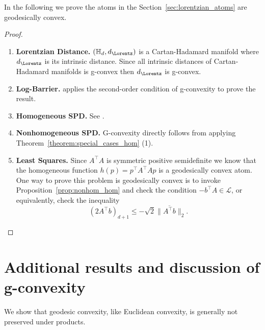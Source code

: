 \documentclass[twoside,11pt]{article}
\begin{document}
\begin{proposition}
    In the following we prove the atoms in the Section~\ref{sec:lorentzian_atoms} are geodesically convex.
\end{proposition}
\begin{proof}
\begin{enumerate}
    \item \textbf{Lorentzian Distance. }$(\mathbb{H}_d, d_\Lorentz)$ is a Cartan-Hadamard manifold where $d_\Lorentz$ is its intrinsic distance. Since all intrinsic distances of Cartan-Hadamard manifolds is g-convex then $d_\Lorentz$ is g-convex.
    \item \textbf{Log-Barrier.}  \citep{Ferreira2022} applies the second-order condition of g-convexity to prove the result.
    \item \textbf{Homogeneous SPD.} See \citep{Ferreira2022}.
    \item \textbf{Nonhomogeneous SPD.} G-convexity directly follows from applying Theorem~\ref{theorem:special_cases_hom} (1).
    \item \textbf{Least Squares.} Since $A^\top A $ is symmetric positive semidefinite we know that the homogeneous function $h(p) = p^\top A^\top A p$ is a geodesically convex atom. One way to prove this problem is geodesically convex is to invoke Proposition~\ref{prop:nonhom_hom} and check the condition $-b^\top A \in \mathscr{L}$, or equivalently, check the inequality
\[ \left(2A^\top b\right)_{d+1} \leq - \sqrt{2}\| \overline{A^\top b}\|_2.
\]
\end{enumerate}
\end{proof}





\section{Additional results and discussion of g-convexity}\label{app:g_cvx_different_metrics}
We show that geodesic convexity, like Euclidean convexity, is generally not preserved under products. 
\end{document}
